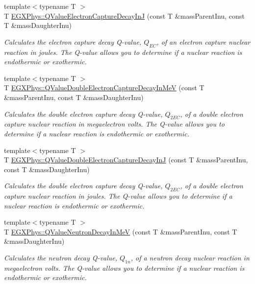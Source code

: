 \begin{DoxyCompactItemize}
{\footnotesize template$<$typename T $>$ }\\T \hyperlink{group___q_value_ga7b523a7d197beb91dcda75ddde12c851}{E\+G\+X\+Phys\+::\+Q\+Value\+Electron\+Capture\+Decay\+InJ} (const T \&mass\+Parent\+Inu, const T \&mass\+Daughter\+Inu)
\begin{DoxyCompactList}\small\item\em Calculates the electron capture decay Q-\/value, $Q_{EC}$, of an electron capture nuclear reaction in joules. The Q-\/value allows you to determine if a nuclear reaction is endothermic or exothermic. \end{DoxyCompactList}\item 
{\footnotesize template$<$typename T $>$ }\\T \hyperlink{group___q_value_ga93e5774784c0d9551e46ba19e1dbc9ab}{E\+G\+X\+Phys\+::\+Q\+Value\+Double\+Electron\+Capture\+Decay\+In\+MeV} (const T \&mass\+Parent\+Inu, const T \&mass\+Daughter\+Inu)
\begin{DoxyCompactList}\small\item\em Calculates the double electron capture decay Q-\/value, $Q_{2EC}$, of a double electron capture nuclear reaction in megaelectron volts. The Q-\/value allows you to determine if a nuclear reaction is endothermic or exothermic. \end{DoxyCompactList}\item 
{\footnotesize template$<$typename T $>$ }\\T \hyperlink{group___q_value_gae25e179b76580bc6af7fa4bdf938ba4e}{E\+G\+X\+Phys\+::\+Q\+Value\+Double\+Electron\+Capture\+Decay\+InJ} (const T \&mass\+Parent\+Inu, const T \&mass\+Daughter\+Inu)
\begin{DoxyCompactList}\small\item\em Calculates the double electron capture decay Q-\/value, $Q_{2EC}$, of a double electron capture nuclear reaction in joules. The Q-\/value allows you to determine if a nuclear reaction is endothermic or exothermic. \end{DoxyCompactList}\item 
{\footnotesize template$<$typename T $>$ }\\T \hyperlink{group___q_value_gaf854b3ac07909a87f44be4e38ebb0c32}{E\+G\+X\+Phys\+::\+Q\+Value\+Neutron\+Decay\+In\+MeV} (const T \&mass\+Parent\+Inu, const T \&mass\+Daughter\+Inu)
\begin{DoxyCompactList}\small\item\em Calculates the neutron decay Q-\/value, $Q_{1n}$, of a neutron decay nuclear reaction in megaelectron volts. The Q-\/value allows you to determine if a nuclear reaction is endothermic or exothermic. \end{DoxyCompactList}\item 

\end{DoxyCompactItemize}
